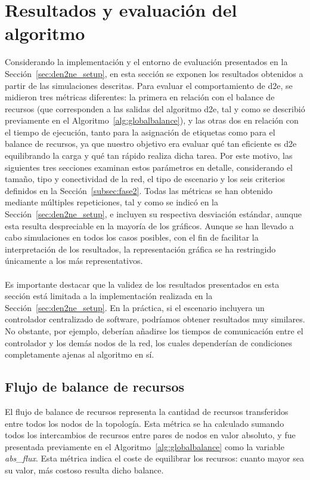 \section{Resultados y evaluación del algoritmo}

Considerando la implementación y el entorno de evaluación presentados en la Sección~\ref{sec:den2ne_setup}, en esta sección se exponen los resultados obtenidos a partir de las simulaciones descritas. Para evaluar el comportamiento de \gls{d2e}, se midieron tres métricas diferentes: la primera en relación con el balance de recursos (que corresponden a las salidas del algoritmo \gls{d2e}, tal y como se describió previamente en el Algoritmo~\ref{alg:globalbalance}), y las otras dos en relación con el tiempo de ejecución, tanto para la asignación de etiquetas como para el balance de recursos, ya que nuestro objetivo era evaluar qué tan eficiente es \gls{d2e} equilibrando la carga y qué tan rápido realiza dicha tarea. Por este motivo, las siguientes tres secciones examinan estos parámetros en detalle, considerando el tamaño, tipo y conectividad de la red, el tipo de escenario y los seis criterios definidos en la Sección~\ref{subsec:fase2}. Todas las métricas se han obtenido mediante múltiples repeticiones, tal y como se indicó en la Sección~\ref{sec:den2ne_setup}, e incluyen su respectiva desviación estándar, aunque esta resulta despreciable en la mayoría de los gráficos. Aunque se han llevado a cabo simulaciones en todos los casos posibles, con el fin de facilitar la interpretación de los resultados, la representación gráfica se ha restringido únicamente a los más representativos.\\
\\
Es importante destacar que la validez de los resultados presentados en esta sección está limitada a la implementación realizada en la Sección~\ref{sec:den2ne_setup}. En la práctica, si el escenario incluyera un controlador centralizado de software, podríamos obtener resultados muy similares. No obstante, por ejemplo, deberían añadirse los tiempos de comunicación entre el controlador y los demás nodos de la red, los cuales dependerían de condiciones completamente ajenas al algoritmo en sí.

\subsection{Flujo de balance de recursos} 

El flujo de balance de recursos representa la cantidad de recursos transferidos entre todos los nodos de la topología. Esta métrica se ha calculado sumando todos los intercambios de recursos entre pares de nodos en valor absoluto, y fue presentada previamente en el Algoritmo~\ref{alg:globalbalance} como la variable \textit{abs\_flux}. Esta métrica indica el coste de equilibrar los recursos: cuanto mayor sea su valor, más costoso resulta dicho balance.\\


